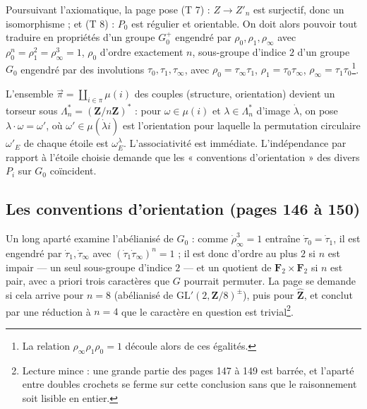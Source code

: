 \documentclass[11pt,a4paper]{article}
\begin{document}
Poursuivant l'axiomatique, la page pose (T 7) : $Z \to Z'_n$ est surjectif,
donc un isomorphisme ; et (T 8) : $P_0$ est régulier et orientable. On doit
alors pouvoir tout traduire en propriétés d'un groupe $G_0^{+}$ engendré par
$\rho_0, \rho_1, \rho_\infty$ avec $\rho_0^n = \rho_1^2 = \rho_\infty^3 = 1$,
$\rho_0$ d'ordre exactement $n$, sous-groupe d'indice $2$ d'un groupe $G_0$
engendré par des involutions $\tau_0, \tau_1, \tau_\infty$, avec $\rho_0 =
\tau_\infty\tau_1$, $\rho_1 = \tau_0\tau_\infty$, $\rho_\infty =
\tau_1\tau_0$\footnote{La relation $\rho_\infty\rho_1\rho_0 = 1$ découle alors
de ces égalités.}.

L'ensemble $\overrightarrow{\pi} = \coprod_{i \in \pi} \mu(i)$ des couples
(structure, orientation) devient un torseur sous $\Lambda_n^{*} =
(\mathbf{Z}/n\mathbf{Z})^{*}$ : pour $\omega \in \mu(i)$ et $\lambda \in
\Lambda_n^{*}$ d'image $\dot\lambda$, on pose $\lambda \cdot \omega = \omega'$,
où $\omega' \in \mu(\dot\lambda i)$ est l'orientation pour laquelle la
permutation circulaire $\omega'_E$ de chaque étoile est $\omega_E^{\lambda}$.
L'associativité est immédiate. L'indépendance par rapport à l'étoile choisie
demande que les « conventions d'orientation » des divers $P_i$ sur $G_0$
coïncident.

\subsection*{Les conventions d'orientation (pages 146 à 150)}

Un long aparté examine l'abélianisé de $G_0$ : comme $\dot\rho_\infty^3 = 1$
entraîne $\dot\tau_0 = \dot\tau_1$, il est engendré par $\dot\tau_1,
\dot\tau_\infty$ avec $(\dot\tau_1\dot\tau_\infty)^n = 1$ ; il est donc
d'ordre au plus $2$ si $n$ est impair --- un seul sous-groupe d'indice $2$ ---
et un quotient de $\mathbf{F}_2 \times \mathbf{F}_2$ si $n$ est pair, avec a
priori trois caractères que $G$ pourrait permuter. La page se demande si cela
arrive pour $n = 8$ (abélianisé de $\mathrm{GL}'(2, \mathbf{Z}/8)^{\pm}$), puis
pour $\widehat{\mathbf{Z}}$, et conclut par une réduction à $n = 4$ que le
caractère en question est trivial\footnote{Lecture mince : une grande partie
des pages 147 à 149 est barrée, et l'aparté entre doubles crochets se ferme
sur cette conclusion sans que le raisonnement soit lisible en entier.}.
\end{document}
